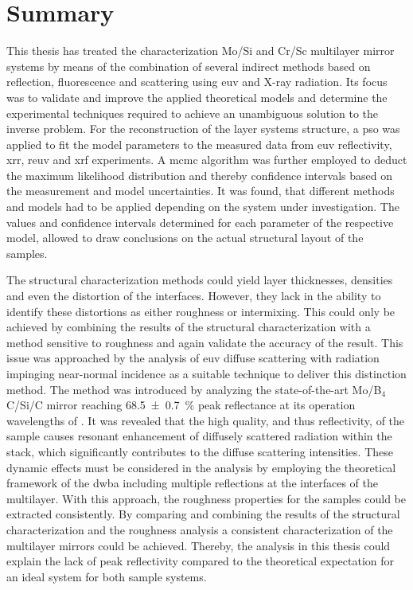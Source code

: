 \glsresetall
\chapter{Summary} \label{ch_summary}
This thesis has treated the characterization Mo/Si and Cr/Sc multilayer mirror systems by means of the combination of several indirect methods based on reflection, fluorescence and scattering using \gls{euv} and X-ray radiation. Its focus was to validate and improve the applied theoretical models and determine the experimental techniques required to achieve an unambiguous solution to the inverse problem. For the reconstruction of the layer systems structure, a \gls{pso} was applied to fit the model parameters to the measured data from \gls{euv} reflectivity, \gls{xrr}, \gls{reuv} and \gls{xrf} experiments. A \gls{mcmc} algorithm was further employed to deduct the maximum likelihood distribution and thereby confidence intervals based on the measurement and model uncertainties. It was found, that different methods and models had to be applied depending on the system under investigation. The values and confidence intervals determined for each parameter of the respective model, allowed to draw conclusions on the actual structural layout of the samples.

The structural characterization methods could yield layer thicknesses, densities and even the distortion of the interfaces. However, they lack in the ability to identify these distortions as either roughness or intermixing. This could only be achieved by combining the results of the structural characterization with a method sensitive to roughness and again validate the accuracy of the result. This issue was approached by the analysis of \gls{euv} diffuse scattering with radiation impinging near-normal incidence as a suitable technique to deliver this distinction method. The method was introduced by analyzing the state-of-the-art Mo/B$_4$C/Si/C mirror reaching \SI{68.5 \pm 0.7}{\percent} peak reflectance at its operation wavelengths of . It was revealed that the high quality, and thus reflectivity, of the sample causes resonant enhancement of diffusely scattered radiation within the stack, which significantly contributes to the diffuse scattering intensities. These dynamic effects must be considered in the analysis by employing the theoretical framework of the \gls{dwba} including multiple reflections at the interfaces of the multilayer. With this approach, the roughness properties for the samples could be extracted consistently. By comparing and combining the results of the structural characterization and the roughness analysis a consistent characterization of the multilayer mirrors could be achieved. Thereby, the analysis in this thesis could explain the lack of peak reflectivity compared to the theoretical expectation for an ideal system for both sample systems.

